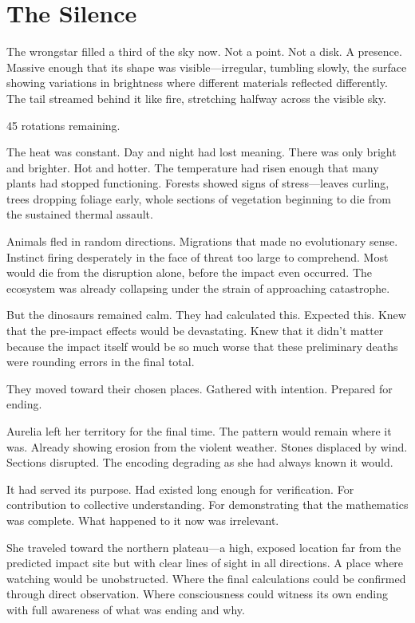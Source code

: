 \chapter{The Silence}
\label{ch:13}


The wrongstar filled a third of the sky now. Not a point. Not a disk. A presence. Massive enough that its shape was visible—irregular, tumbling slowly, the surface showing variations in brightness where different materials reflected differently. The tail streamed behind it like fire, stretching halfway across the visible sky.

45 rotations remaining.

The heat was constant. Day and night had lost meaning. There was only bright and brighter. Hot and hotter. The temperature had risen enough that many plants had stopped functioning. Forests showed signs of stress—leaves curling, trees dropping foliage early, whole sections of vegetation beginning to die from the sustained thermal assault.

Animals fled in random directions. Migrations that made no evolutionary sense. Instinct firing desperately in the face of threat too large to comprehend. Most would die from the disruption alone, before the impact even occurred. The ecosystem was already collapsing under the strain of approaching catastrophe.

But the dinosaurs remained calm. They had calculated this. Expected this. Knew that the pre-impact effects would be devastating. Knew that it didn't matter because the impact itself would be so much worse that these preliminary deaths were rounding errors in the final total.

They moved toward their chosen places. Gathered with intention. Prepared for ending.

\scenebreak

Aurelia left her territory for the final time. The pattern would remain where it was. Already showing erosion from the violent weather. Stones displaced by wind. Sections disrupted. The encoding degrading as she had always known it would.

It had served its purpose. Had existed long enough for verification. For contribution to collective understanding. For demonstrating that the mathematics was complete. What happened to it now was irrelevant.

She traveled toward the northern plateau—a high, exposed location far from the predicted impact site but with clear lines of sight in all directions. A place where watching would be unobstructed. Where the final calculations could be confirmed through direct observation. Where consciousness could witness its own ending with full awareness of what was ending and why.

